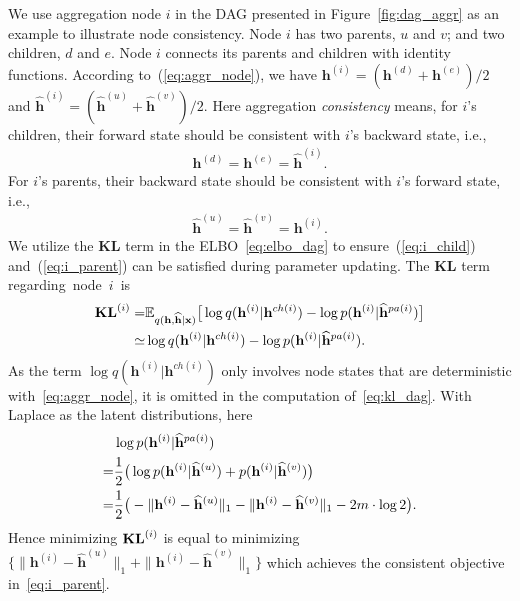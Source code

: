 \documentclass[sigconf, anonymous, review]{acmart}
\theoremstyle{plain}
\theoremstyle{definition}
\theoremstyle{remark}
\begin{document}
We use aggregation node $i$ in the DAG presented in Figure~\ref{fig:dag_aggr} as an example to illustrate node  consistency. Node $i$ has two parents, $u$ and $v$; and two children, $d$ and $e$. Node $i$  connects its parents and children with identity functions. According to~(\ref{eq:aggr_node}), we have $\mathbf{h}^{(i)} = (\mathbf{h}^{(d)}+\mathbf{h}^{(e)})/2$  and $\widehat{\mathbf{h}}^{(i)} = (\widehat{\mathbf{h}}^{(u)}+\widehat{\mathbf{h}}^{(v)})/2$.
Here aggregation \emph{consistency} means, for $i$'s children, their forward state should be consistent with $i$'s backward state, i.e., 
\begin{align}\label{eq:i_child}
\mathbf{h}^{(d)} = \mathbf{h}^{(e)} = \widehat{\mathbf{h}}^{(i)} .
\end{align}
For $i$'s parents, their backward state should be consistent with $i$'s forward state, i.e.,
\begin{align}\label{eq:i_parent}
\widehat{\mathbf{h}}^{(u)}  = \widehat{\mathbf{h}}^{(v)}  = \mathbf{h}^{(i)} .
\end{align}%
We utilize the $\mathbf{KL}$ term in the ELBO~\eqref{eq:elbo_dag} to ensure~(\ref{eq:i_child}) and~(\ref{eq:i_parent}) can be satisfied during parameter updating. The $\mathbf{KL}$ term regarding~node~$i$~is
\begin{align}\label{eq:kl_dag}
\textbf{\text{KL}}^{(i)} = & \mathbb{E}_{q(\mathbf{h}, \widehat{\mathbf{h}}|\mathbf{x})}\big[  \log q(\mathbf{h}^{(i)}|\mathbf{h}^{ch(i)})  - \log p(\mathbf{h}^{(i)}|\widehat{\mathbf{h}}^{pa(i)}) \big]  \\ \notag
\simeq  & \log q(\mathbf{h}^{(i)}|\mathbf{h}^{ch(i)})  - \log p(\mathbf{h}^{(i)}|\widehat{\mathbf{h}}^{pa(i)}).
\end{align} %
As the term $\log q(\mathbf{h}^{(i)}|\mathbf{h}^{ch(i)})$ only involves node states that are deterministic with~\eqref{eq:aggr_node}, it is omitted in the computation of~\eqref{eq:kl_dag}. With Laplace as the latent distributions, here 
{%
\begin{align} \notag
&\log p(\mathbf{h}^{(i)}|\widehat{\mathbf{h}}^{pa(i)}) \\ \notag
= &\frac{1}{2}\big(\log p(\mathbf{h}^{(i)}|\widehat{\mathbf{h}}^{(u)}) + p(\mathbf{h}^{(i)}|\widehat{\mathbf{h}}^{(v)})\big)\\ \notag
=& \frac{1}{2}\big(-\|\mathbf{h}^{(i)}- \widehat{\mathbf{h}}^{(u)}\|_1 -\|\mathbf{h}^{(i)}- \widehat{\mathbf{h}}^{(v)}\|_1-2m\cdot\log2 \big).
\end{align}}
Hence minimizing $\textbf{\text{KL}}^{(i)}$ is equal to minimizing $\{\|\mathbf{h}^{(i)}- \widehat{\mathbf{h}}^{(u)}\|_1 + \|\mathbf{h}^{(i)}- \widehat{\mathbf{h}}^{(v)}\|_1 \}$ which achieves the consistent objective in~\eqref{eq:i_parent}. 
\end{document}
